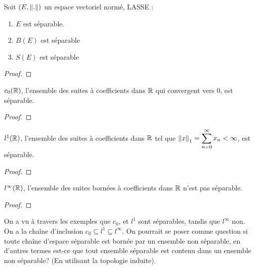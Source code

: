 \begin{proposition}
	Soit $(E, \norm{.})$ un espace vectoriel normé, LASSE :
	\begin{enumerate}
		\item $E$ est séparable.
		\item $B(E)$ est séparable
		\item $S(E)$ est séparable
	\end{enumerate}
\end{proposition}

\ifdefined\outputproof
\begin{proof}

\end{proof}
\fi

\begin{proposition}
	$c_{0}(\mathbb{R})$, l'ensemble des suites à coefficients dans $\mathbb{R}$
	qui convergent vers 0, est séparable.
\end{proposition}

\ifdefined\outputproof
\begin{proof}

\end{proof}
\fi

\begin{proposition}
	$l^{1}(\mathbb{R})$, l'ensemble des suites à coefficients dans $\mathbb{R}$
	tel que $\norm{x}_{1} = \displaystyle \sum_{n = 0}^{\infty} x_{n} < \infty$, est
	séparable.
\end{proposition}

\ifdefined\outputproof
\begin{proof}

\end{proof}
\fi

\begin{proposition}
	$l^{\infty}(\mathbb{R})$, l'ensemble des suites bornées à coefficients dans
	$\mathbb{R}$ n'est pas séparable.
\end{proposition}

\ifdefined\outputproof
\begin{proof}

\end{proof}
\fi

\begin{question}
	On a vu à travers les exemples que $c_{0}$, et $l^{1}$ sont séparables,
	tandis que $l^{\infty}$ non. On a la chaîne d'inclusion $c_{0} \subseteq
	l^{1} \subseteq l^{\infty}$.
	On pourrait se poser comme question si toute chaîne d'espace séparable
	est bornée par un ensemble non séparable, en d'autres termes est-ce que tout
	ensemble séparable est contenu dans un ensemble non séparable? (En
	utilisant la topologie induite).
\end{question}
